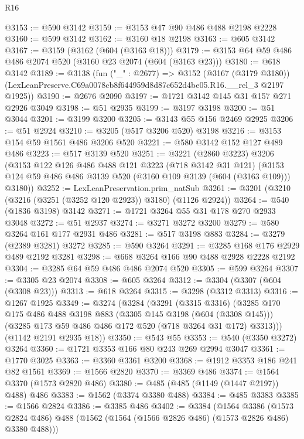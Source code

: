 \begin{lexlean}{R16}
\begin{coremodule}
@3153 := @590 @3142
@3159 := @3153 @47 @90 @486 @488 @2198 @2228
@3160 := @599 @3142
@3162 := @3160 @18 @2198
@3163 := @605 @3142
@3167 := @3159 (@3162 (@604 (@3163 @18)))
@3179 := @3153 @64 @59 @486 @486 @2074 @520 (@3160 @23 @2074 (@604 (@3163 @23)))
@3180 := @618 @3142
@3189 := @3138
    (fun ("_" : @2677) =>
    @3152
      (@3167 (@3179 @3180))
      (LexLeanPreserve.C69a0078cb8f644959d8d87c652d4be05.R16.__rel_3 @2197 @1925))
@3190 := @2676 @2090
@3197 := @1721 @3142 @145 @31 @157 @271 @2926 @3049
@3198 := @51 @2935
@3199 := @3197 @3198
@3200 := @51 @3044
@3201 := @3199 @3200
@3205 := @3143 @55 @156 @2469 @2925
@3206 := @51 @2924
@3210 := @3205 (@517 @3206 @520) @3198
@3216 := @3153 @154 @59 @1561 @486 @3206 @520
@3221 := @580 @3142 @152 @127 @489 @486
@3223 := @517 @3139 @520
@3251 := @3221
    (@2860 @3223)
    @3206
    (@3153
      @122
      @126
      @486
      @488
      @121
      @3223
      (@718 @3142 @31 @121)
      (@3153 @124 @59 @486 @486 @3139 @520 (@3160 @109 @3139 (@604 (@3163 @109))) @3180))
@3252 := LexLeanPreservation.prim_natSub
@3261 := @3201 (@3210 (@3216 (@3251 (@3252 @120 @2923)) @3180) (@1126 @2924))
@3264 := @540 (@1836 @3198) @3142
@3271 := @1721 @3264 @55 @31 @178 @270 @2933 @3048
@3272 := @51 @2937
@3274 := @3271 @3272 @3200
@3279 := @580 @3264 @161 @177 @2931 @486
@3281 := @517 @3198 @883
@3284 := @3279 (@2389 @3281) @3272
@3285 := @590 @3264
@3291 := @3285 @168 @176 @2929 @489 @2192 @3281
@3298 := @668 @3264 @166 @90 @488 @2928 @2228 @2192
@3304 := @3285 @64 @59 @486 @486 @2074 @520
@3305 := @599 @3264
@3307 := @3305 @23 @2074
@3308 := @605 @3264
@3312 := @3304 (@3307 (@604 (@3308 @23)))
@3313 := @618 @3264
@3315 := @3298 (@3312 @3313)
@3316 := @1267 @1925
@3349 := @3274
    (@3284
      (@3291
        (@3315 @3316)
        (@3285
          @170
          @175
          @486
          @488
          @3198
          @883
          (@3305 @145 @3198 (@604 (@3308 @145)))
          (@3285 @173 @59 @486 @486 @172 @520 (@718 @3264 @31 @172) @3313)))
      (@1142 @2191 @2935 @18))
@3350 := @543 @55
@3353 := @540 (@3350 @3272) @3264
@3360 := @1721 @3353 @166 @80 @243 @269 @2994 @3047
@3361 := @1770 @3025
@3363 := @3360 @3361 @3200
@3368 := @1912 @3353 @186 @241 @82 @1561
@3369 := @1566 @2820
@3370 := @3369 @486
@3374 := @1564 @3370 (@1573 @2820 @486)
@3380 := @485 (@485 (@1149 (@1447 @2197)) @488) @486
@3383 := @1562 (@3374 @3380 @488)
@3384 := @485 @3383
@3385 := @1566 @2824
@3386 := @3385 @486
@3402 := @3384
    (@1564
      @3386
      (@1573 @2824 @486)
      @488
      (@1562 (@1564 (@1566 @2826 @486) (@1573 @2826 @486) @3380 @488)))

\end{coremodule}
\end{lexlean}

